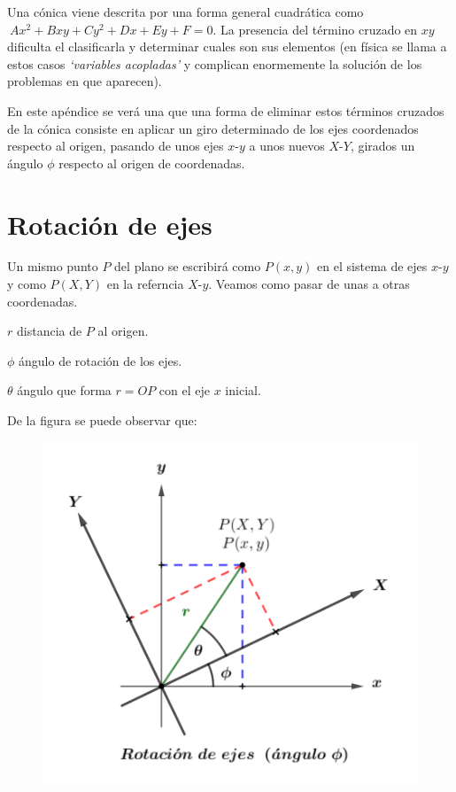 Una cónica viene descrita por una forma general cuadrática como $\ Ax^2+Bxy+Cy^2+Dx+Ey+F=0$. La presencia del término cruzado en $xy$  dificulta el clasificarla y determinar cuales son sus elementos (en física se llama a estos casos \emph{`variables acopladas'} y complican enormemente la solución de los problemas en que aparecen). 

En este apéndice se verá una que una forma de eliminar estos términos cruzados de la cónica consiste en aplicar un giro determinado de los ejes coordenados respecto al origen, pasando de unos ejes $x$-$y$ a unos nuevos $X$-$Y$, girados un ángulo $\phi$ respecto al origen de coordenadas.

\section{Rotación de ejes}


\begin{multicols}{2}
Un mismo punto $P$ del plano se escribirá como $P(x,y)$ en el sistema de ejes $x$-$y$ y como $P(X,Y)$ en la referncia $X$-$y$. Veamos como pasar de unas a otras coordenadas.

\vspace{2mm} $r$ distancia de $P$ al origen.

\vspace{1mm} $\phi$ ángulo de rotación de los ejes.

\vspace{1mm} $\theta$ ángulo que forma $r=OP$ con el eje $x$ inicial.

\vspace{1mm} De la figura se puede observar que:

\begin{figure}[H]
	\centering
	\includegraphics[width=.5\textwidth]{img-conicas/conicas50.png}
	\end{figure}		
\end{multicols}

